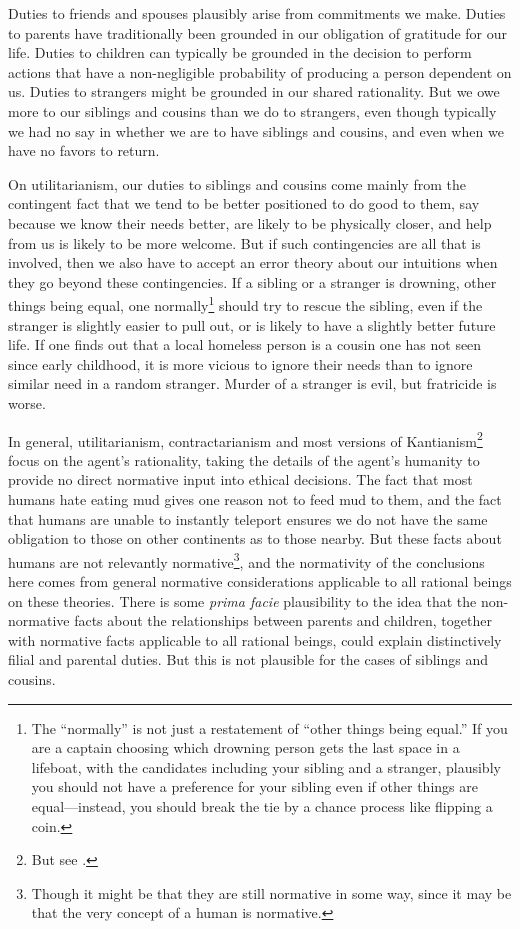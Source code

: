 Duties to friends and spouses plausibly
arise from commitments we make. Duties to parents have traditionally been grounded in our obligation of gratitude for our life. Duties to children can
typically be grounded in the decision to perform actions that have a non-negligible probability of producing a person dependent on us. Duties to strangers
might be grounded in our shared rationality. But we owe more to our siblings and cousins than we do to strangers, even though typically we had no say in whether
we are to have siblings and cousins, and even when we have no favors to return.

On utilitarianism, our duties to siblings and cousins come mainly from the contingent fact that we tend to be better positioned to do good to them, say because we know
their needs better, are likely to be physically closer, and help from us is likely to be more welcome. But if such contingencies are all that is involved, then we also
have to accept an error theory about our intuitions when they go beyond these contingencies. If a sibling or a stranger is drowning, other things being equal, one normally\footnote{The ``normally'' is not just a restatement of ``other things
being equal.'' If you are a captain choosing which drowning person gets the last space in a lifeboat, with the candidates including
your sibling and a stranger, plausibly you should not have a preference for your sibling even if other things are equal---instead, you
should break the tie by a chance process like flipping a coin.} should
try to rescue the sibling, even if the stranger is slightly easier to pull out, or is likely to have a slightly better future life. If one finds out that a local
homeless person is a cousin one has not seen since early childhood, it is more vicious to ignore their needs than to ignore similar need in a random stranger.
Murder of a stranger is evil, but fratricide is worse.

In general, utilitarianism, contractarianism and most versions of Kantianism\footnote{But see .} focus on the agent's rationality, taking the details of the agent's humanity to provide no direct normative
input into ethical decisions. The fact that most humans hate eating mud gives one reason not to feed mud to them, and the fact that humans are unable to instantly
teleport ensures we do not have the same obligation to those on other continents as to those nearby. But these facts
about humans are not relevantly normative\footnote{Though it might be that they are still normative in some way, since
it may be that the very concept of a human is normative.}, and the normativity of the
conclusions here comes from general normative considerations applicable to all rational beings on these theories. There is some \textit{prima facie} plausibility to the idea
that the non-normative facts about the relationships between parents and children, together with normative facts applicable to all rational beings, could explain
distinctively filial and parental duties. But this is not plausible for the cases of siblings and cousins.


